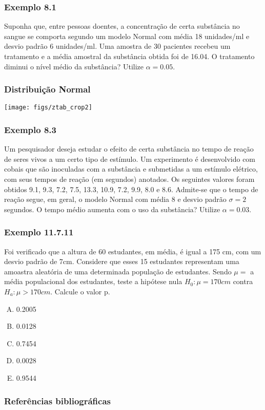 \documentclass[11pt]{beamer}
\begin{document}
\begin{frame}
\frametitle{Exemplo 8.1}
Suponha que, entre pessoas doentes, a concentração de certa substância no sangue se comporta segundo um modelo Normal com média 18 unidades/ml e desvio padrão 6 unidades/ml. Uma amostra de 30 pacientes recebeu um tratamento e a média amostral da substância obtida foi de 16.04. O tratamento diminui o nível médio da substância? Utilize \(\alpha=0.05\).
\vspace{1in}
\vspace{1in}

\end{frame}

\begin{frame}
\frametitle{Distribuição Normal}

\begin{center}\texttt{[image: figs/ztab\_crop2]} \end{center}
\end{frame}


\begin{frame}
\frametitle{Exemplo 8.3}
Um pesquisador deseja estudar o efeito de certa substância no tempo de reação de seres vivos a um certo tipo de estímulo. Um experimento é desenvolvido com cobais que são inoculadas com a substância e submetidas a um estímulo elétrico, com seus tempos de reação (em segundos) anotados. Os seguintes valores foram obtidos 9.1, 9.3, 7.2, 7.5, 13.3, 10.9, 7.2, 9.9, 8.0 e 8.6. Admite-se que o tempo de reação segue, em geral, o modelo Normal com média 8 e desvio padrão \(\sigma =2\) segundos. O tempo médio aumenta com o uso da substância? Utilize \(\alpha=0.03\).
\vspace{1in}
\vspace{1in}

\end{frame}

\begin{frame}
\frametitle{Exemplo 11.7.11}
Foi verificado que a altura de 60 estudantes, em média, é igual a 175 cm, com um desvio padrão de 7cm. Considere que esses 15 estudantes representam uma amoastra aleatória de uma determinada população de estudantes. Sendo \(\mu=\) a média populacional dos estudantes, teste a hipótese nula \(H_0:\mu=170cm\) contra \(H_a:\mu>170cm\). Calcule o valor p. 
\begin{enumerate}[A)]
\item 0.2005
\item 0.0128
\item 0.7454
\item 0.0028
\item 0.9544
\end{enumerate}

\end{frame}


\begin{frame}
\frametitle{Referências bibliográficas}
\printbibliography
\end{frame}
\end{document}
